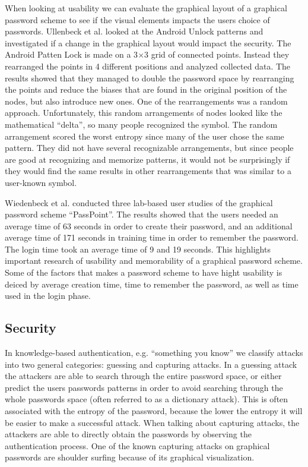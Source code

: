   When looking at usability we can evaluate the graphical layout of a graphical password scheme to see if the visual elements impacts the users choice of passwords. Ullenbeck et al. \cite{Uellenbeck} looked at the Android Unlock patterns and investigated if a change in the graphical layout would impact the security. The Android Patten Lock is made on a 3$\times$3 grid of connected points. Instead they rearranged the points in 4 different positions and analyzed collected data. The results showed that they managed to double the password space by rearranging the points and reduce the biases that are found in the original position of the nodes, but also introduce new ones. One of the rearrangements was a random approach. Unfortunately, this random arrangements of nodes looked like the mathematical ``delta'', so many people recognized the symbol. The random arrangement scored the worst entropy since many of the user chose the same pattern. They did not have several recognizable arrangements, but since people are good at recognizing and memorize patterns, it would not be surprisingly if they would find the same results in other rearrangements that was similar to a user-known symbol.  

  Wiedenbeck et al. \cite{Wiedenbeck1, Wiedenbeck2, Wiedenbeck3} conducted three lab-based user studies of the graphical password scheme ``PassPoint''. The results showed that the users needed an average time of 63 seconds in order to create their password, and an additional average time of 171 seconds in training time in order to remember the password. The login time took an average time of 9 and 19 seconds. This highlights important research of usability and memorability of a graphical password scheme. Some of the factors that makes a password scheme to have hight usability is deiced by average creation time, time to remember the password, as well as time used in the login phase. 


    
\subsection{Security}

  In knowledge-based authentication, e.g. ``something you know'' we classify attacks into two general categories: guessing and capturing attacks. In a guessing attack the attackers are able to search through the entire password space, or either predict the users passwords patterns in order to avoid searching through the whole passwords space (often referred to as a dictionary attack). This is often associated with the entropy of the password, because the lower the entropy it will be easier to make a successful attack. When talking about capturing attacks, the attackers are able to directly obtain the passwords by observing the authentication process. One of the known capturing attacks on graphical passwords are shoulder surfing because of its graphical visualization.  

